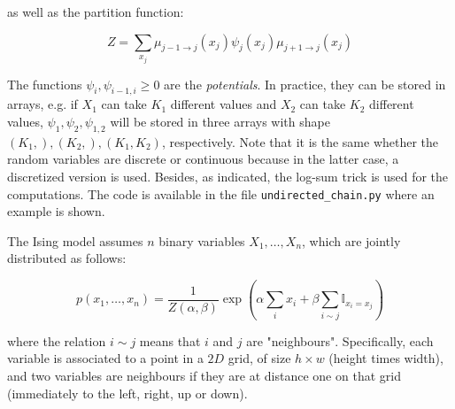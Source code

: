 \documentclass[a4paper, 11pt]{report}
\begin{document}
\begin{enumerate}
    as well as the partition function:
    
    \begin{equation*}
        Z = \sum_{x_j} \mu_{j-1 \rightarrow j} \left( x_j \right) \psi_j \left( x_j \right) \mu_{j+1 \rightarrow j} \left( x_j \right) 
    \end{equation*}
    
    The functions $\psi_i, \psi_{i-1, i} \geq 0$ are the \emph{potentials}. In practice, they can be stored in arrays, e.g. if $X_1$ can take $K_1$ different values and $X_2$ can take $K_2$ different values, $\psi_1, \psi_2, \psi_{1, 2}$ will be stored in three arrays with shape $\left(K_1,\right), \left(K_2,\right), \left(K_1, K_2\right)$, respectively. Note that it is the same whether the random variables are discrete or continuous because in the latter case, a discretized version is used. Besides, as indicated, the log-sum trick is used for the computations. The code is available in the file \texttt{undirected\_chain.py} where an example is shown. \\
\end{enumerate}

The Ising model assumes $n$ binary variables $X_1, \dots, X_n$, which are jointly distributed as follows:

\begin{equation*}
    p \left( x_1, \dots, x_n \right) = \frac{1}{Z \left( \alpha, \beta \right)} \exp \left( \alpha \sum_{i} x_i + \beta \sum_{i \sim j} \mathbb{I}_{x_i = x_j} \right)
\end{equation*}

where the relation $i \sim j$ means that $i$ and $j$ are "neighbours". Specifically, each variable is associated to a point in a $2D$ grid, of size $h \times w$ (height times width), and two variables are neighbours if they are at distance one on that grid (\ie immediately to the left, right, up or down).
\end{document}
